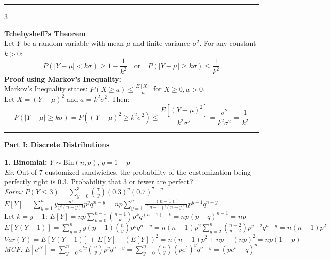 \documentclass[10pt]{article}
\begin{document}
\vspace{2mm}
\hrule
\vspace{3mm}

\begin{multicols*}{3}

\textbf{Tchebysheff's Theorem}\\
Let $Y$ be a random variable with mean $\mu$ and finite variance $\sigma^2$. For any constant $k > 0$:
$$ P(|Y-\mu| < k\sigma) \ge 1 - \frac{1}{k^2} \quad \text{or} \quad P(|Y-\mu| \ge k\sigma) \le \frac{1}{k^2} $$
\textbf{Proof using Markov's Inequality:}\\
Markov's Inequality states: $P(X \ge a) \le \frac{E[X]}{a}$ for $X \ge 0, a > 0$.\\
Let $X = (Y-\mu)^2$ and $a = k^2\sigma^2$. Then:
$$ P(|Y-\mu| \ge k\sigma) = P((Y-\mu)^2 \ge k^2\sigma^2) \le \frac{E[(Y-\mu)^2]}{k^2\sigma^2} = \frac{\sigma^2}{k^2\sigma^2} = \frac{1}{k^2} $$

\vspace{2mm}
\hrule
\vspace{2mm}

\begin{center}
\textbf{Part I: Discrete Distributions}
\end{center}

\textbf{1. Binomial:} $Y \sim \text{Bin}(n, p)$, $q = 1-p$\\
\textit{Ex:} Out of 7 customized sandwiches, the probability of the customization being perfectly right is 0.3. Probability that 3 or fewer are perfect?\\
\textit{Form:} $P(Y \le 3) = \sum_{y=0}^{3} \binom{7}{y} (0.3)^y (0.7)^{7-y}$\\
$E[Y] = \sum_{y=1}^{n} y \frac{n!}{y!(n-y)!} p^y q^{n-y} = np \sum_{y=1}^{n} \frac{(n-1)!}{(y-1)!(n-y)!} p^{y-1} q^{n-y}$\\
Let $k=y-1$: $E[Y] = np \sum_{k=0}^{n-1} \binom{n-1}{k} p^k q^{(n-1)-k} = np(p+q)^{n-1} = np$\\
$E[Y(Y-1)] = \sum_{y=2}^{n} y(y-1) \binom{n}{y} p^y q^{n-y} = n(n-1)p^2 \sum_{y=2}^{n} \binom{n-2}{y-2} p^{y-2} q^{n-y} = n(n-1)p^2$\\
$Var(Y) = E[Y(Y-1)] + E[Y] - (E[Y])^2 = n(n-1)p^2 + np - (np)^2 = np(1-p)$\\
\textit{MGF:} $E[e^{tY}] = \sum_{y=0}^{n} e^{ty} \binom{n}{y} p^y q^{n-y} = \sum_{y=0}^{n} \binom{n}{y} (pe^t)^y q^{n-y} = (pe^t + q)^n$

\vspace{2mm}


\end{multicols*}
\end{document}
